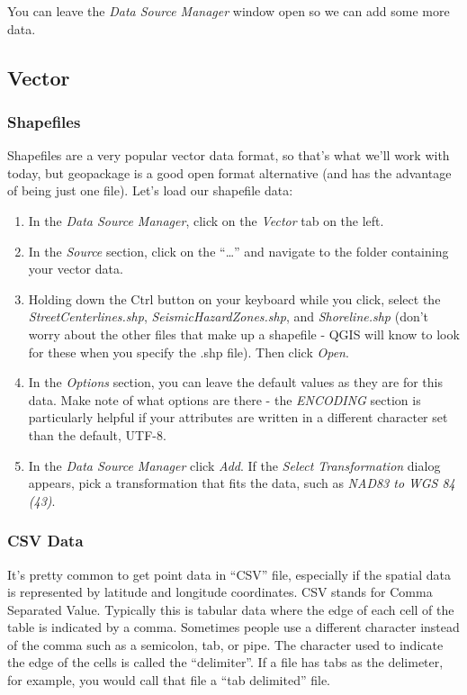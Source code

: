\documentclass[
]{article}
\providecommand{\tightlist}{%
  \setlength{\itemsep}{0pt}\setlength{\parskip}{0pt}}
\begin{document}
You can leave the \emph{Data Source Manager} window open so we can add some more data.

\hypertarget{vector}{%
\subsection{Vector}\label{vector}}

\hypertarget{shapefiles}{%
\subsubsection{Shapefiles}\label{shapefiles}}

Shapefiles are a very popular vector data format, so that's what we'll work with today, but geopackage is a good open format alternative (and has the advantage of being just one file). Let's load our shapefile data:

\begin{enumerate}
\def\labelenumi{\arabic{enumi}.}
\tightlist
\item
  In the \emph{Data Source Manager}, click on the \emph{Vector} tab on the left.
\item
  In the \emph{Source} section, click on the ``\ldots{}'' and navigate to the folder containing your vector data.
\item
  Holding down the Ctrl button on your keyboard while you click, select the \emph{StreetCenterlines.shp}, \emph{SeismicHazardZones.shp}, and \emph{Shoreline.shp} (don't worry about the other files that make up a shapefile - QGIS will know to look for these when you specify the .shp file). Then click \emph{Open}.
\item
  In the \emph{Options} section, you can leave the default values as they are for this data. Make note of what options are there - the \emph{ENCODING} section is particularly helpful if your attributes are written in a different character set than the default, UTF-8.
\item
  In the \emph{Data Source Manager} click \emph{Add}. If the \emph{Select Transformation} dialog appears, pick a transformation that fits the data, such as \emph{NAD83 to WGS 84 (43)}.
\end{enumerate}

\hypertarget{csv-data}{%
\subsubsection{CSV Data}\label{csv-data}}

It's pretty common to get point data in ``CSV'' file, especially if the spatial data is represented by latitude and longitude coordinates. CSV stands for Comma Separated Value. Typically this is tabular data where the edge of each cell of the table is indicated by a comma. Sometimes people use a different character instead of the comma such as a semicolon, tab, or pipe. The character used to indicate the edge of the cells is called the ``delimiter''. If a file has tabs as the delimeter, for example, you would call that file a ``tab delimited'' file.
\end{document}
